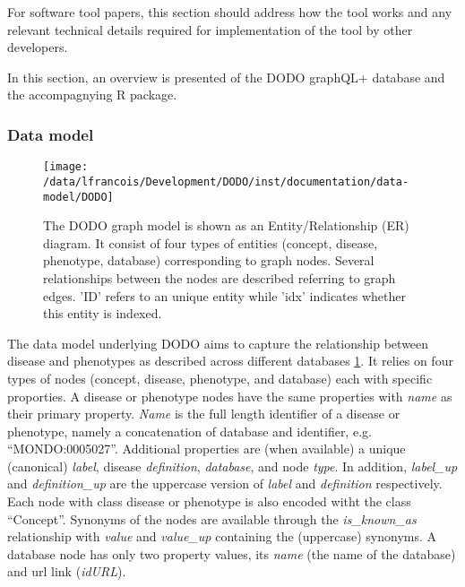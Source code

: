 \documentclass[9pt,a4paper,]{extarticle}
\begin{document}
For software tool papers, this section should address how the tool works and any relevant technical details required for implementation of the tool by other developers.

In this section, an overview is presented of the DODO graphQL+ database and the accompagnying R package.

\hypertarget{data-model}{%
\subsubsection{Data model}\label{data-model}}

\begin{figure}

{\centering \texttt{[image: /data/lfrancois/Development/DODO/inst/documentation/data-model/DODO]} 

}

\caption{The DODO graph model is shown as an Entity/Relationship (ER) diagram. It consist of four types of entities (concept, disease, phenotype, database) corresponding to graph nodes. Several relationships between the nodes are described referring to graph edges. 'ID' refers to an unique entity while 'idx' indicates whether this entity is indexed.}\label{fig:dataModel}
\end{figure}

The data model underlying DODO aims to capture the relationship between disease and phenotypes as described across different databases \ref{fig:dataModel}. It relies on four types of nodes (concept, disease, phenotype, and database) each with specific proporties. A disease or phenotype nodes have the same properties with \emph{name} as their primary property. \emph{Name} is the full length identifier of a disease or phenotype, namely a concatenation of database and identifier, e.g. ``MONDO:0005027''. Additional properties are (when available) a unique (canonical) \emph{label}, disease \emph{definition}, \emph{database}, and node \emph{type}. In addition, \emph{label\_up} and \emph{definition\_up} are the uppercase version of \emph{label} and \emph{definition} respectively. Each node with class disease or phenotype is also encoded witht the class ``Concept''. Synonyms of the nodes are available through the \emph{is\_known\_as} relationship with \emph{value} and \emph{value\_up} containing the (uppercase) synonyms. A database node has only two property values, its \emph{name} (the name of the database) and url link (\emph{idURL}).
\end{document}
